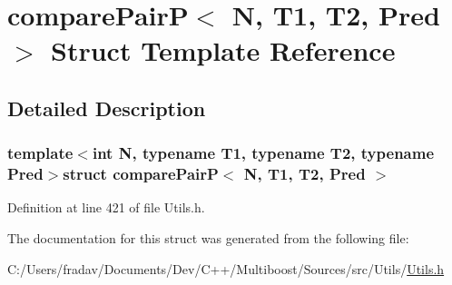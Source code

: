 \hypertarget{structcomparePairP}{\section{compare\-Pair\-P$<$ N, T1, T2, Pred $>$ Struct Template Reference}
\label{structcomparePairP}
}


\subsection{Detailed Description}
\subsubsection*{template$<$int N, typename T1, typename T2, typename Pred$>$struct compare\-Pair\-P$<$ N, T1, T2, Pred $>$}



Definition at line 421 of file Utils.\-h.



The documentation for this struct was generated from the following file\-:\begin{DoxyCompactItemize}
\item 
C\-:/\-Users/fradav/\-Documents/\-Dev/\-C++/\-Multiboost/\-Sources/src/\-Utils/\hyperlink{Utils_8h}{Utils.\-h}\end{DoxyCompactItemize}
